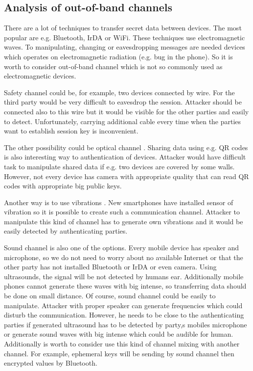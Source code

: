 \documentclass[11pt,titlepage]{article}
\theoremstyle{plain}
\begin{document}
\subsection{Analysis of out-of-band channels}
There are a lot of techniques to transfer secret data between devices. The most popular are e.g. Bluetooth, IrDA or WiFi. These techniques use electromagnetic waves. To manipulating, changing or eavesdropping messages are needed devices which operates on electromagnetic radiation (e.g. bug in the phone). So it is worth to consider out-of-band channel which is not so commonly used as electromagnetic devices.

\vspace{5mm}

Safety channel could be, for example, two devices connected by wire. For the third party would be very difficult to eavesdrop the session. Attacker should be connected also to this wire but it would be visible for the other parties and easily to detect. Unfortunately, carrying additional cable every time when the parties want to establish session key is inconvenient.

\vspace{5mm}

The other possibility could be optical channel \cite{QRcode}. Sharing data using e.g. QR codes is also interesting way to authentication of devices. Attacker would have difficult task to manipulate shared data if e.g. two devices are covered by some walls. However, not every device has camera with appropriate quality that can read QR codes with appropriate big public keys.

\vspace{5mm}

Another way is to use vibrations \cite{vibrat}. New smartphones have installed sensor of vibration so it is possible to create such a communication channel. Attacker to manipulate this kind of channel has to generate own vibrations and it would be easily detected by authenticating parties.

\vspace{5mm}

Sound channel is also one of the options. Every mobile device has speaker and microphone, so we do not need to worry about no available Internet or that the other party has not installed Bluetooth or IrDA or even camera. Using ultrasounds, the signal will be not detected by humans ear. Additionally mobile phones cannot generate these waves with big intense, so transferring data should be done on small distance. Of course, sound channel could be easily to manipulate. Attacker with proper speaker can generate frequencies which could disturb the communication. However, he needs to be close to the authenticating parties if generated ultrasound has to be detected by party,s mobiles microphone or generate sound waves with big intense which could be audible for human. Additionally is worth to consider use this kind of channel mixing with another channel. For example, ephemeral keys will be sending by sound channel then encrypted values by Bluetooth.
\end{document}
